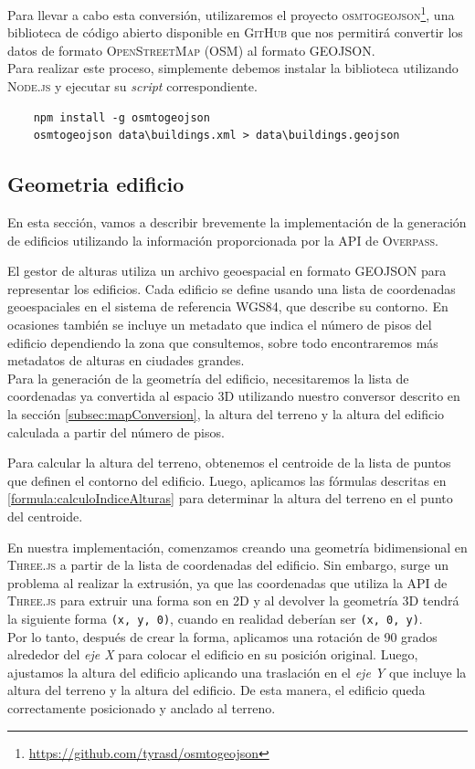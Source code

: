 \documentclass[a4paper, 11pt]{book}
\begin{document}
Para llevar a cabo esta conversión, utilizaremos el proyecto \textsc{osmtogeojson}\footnote{\url{https://github.com/tyrasd/osmtogeojson}}, una biblioteca de código abierto disponible en \textsc{GitHub} que nos permitirá convertir los datos de formato \textsc{OpenStreetMap} (\textsc{OSM}) al formato \textsc{GEOJSON}. \\
Para realizar este proceso, simplemente debemos instalar la biblioteca utilizando \textsc{Node.js} y ejecutar su \emph{script} correspondiente.

\label{manual:osmtogeojson}
{\scriptsize
    \begin{verbatim}
    npm install -g osmtogeojson
    osmtogeojson data\buildings.xml > data\buildings.geojson
    \end{verbatim}
}

\subsection{Geometria edificio}
\label{subsec:buildingGeometry}
En esta sección, vamos a describir brevemente la implementación de la generación de edificios utilizando la información proporcionada por la \textsc{API} de \textsc{Overpass}.

El gestor de alturas utiliza un archivo geoespacial en formato \textsc{GEOJSON} para representar los edificios. Cada edificio se define usando una lista de coordenadas geoespaciales en el sistema de referencia \textsc{WGS84}, que describe su contorno. En ocasiones también se incluye un metadato que indica el número de pisos del edificio dependiendo la zona que consultemos, sobre todo encontraremos más metadatos de alturas en ciudades grandes. \\
Para la generación de la geometría del edificio, necesitaremos la lista de coordenadas ya convertida al espacio \textsc{3D} utilizando nuestro conversor descrito en la sección \ref{subsec:mapConversion}, la altura del terreno y la altura del edificio calculada a partir del número de pisos.

Para calcular la altura del terreno, obtenemos el centroide de la lista de puntos que definen el contorno del edificio. Luego, aplicamos las fórmulas descritas en \ref{formula:calculoIndiceAlturas} para determinar la altura del terreno en el punto del centroide.

En nuestra implementación, comenzamos creando una geometría bidimensional en \textsc{Three.js} a partir de la lista de coordenadas del edificio. Sin embargo, surge un problema al realizar la extrusión, ya que las coordenadas que utiliza la API de \textsc{Three.js} para extruir una forma son en 2D y al devolver la geometría 3D tendrá la siguiente forma \texttt{(x, y, 0)}, cuando en realidad deberían ser \texttt{(x, 0, y)}.\\ 
Por lo tanto, después de crear la forma, aplicamos una rotación de 90 grados alrededor del \emph{eje X} para colocar el edificio en su posición original. Luego, ajustamos la altura del edificio aplicando una traslación en el \emph{eje Y} que incluye la altura del terreno y la altura del edificio. De esta manera, el edificio queda correctamente posicionado y anclado al terreno.
\end{document}
